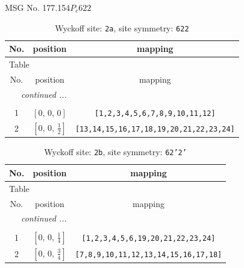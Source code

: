 \documentclass[fleqn,8pt]{jsarticle}
\begin{document}
\setcounter{MaxMatrixCols}{32}

\renewcommand{\tablename}{Table~}
\renewcommand{\figurename}{Figure~}
\begin{center}
\LARGE
MSG No. 177.154\quad$P_{c}622$
\end{center}
\renewcommand{\arraystretch}{1.2}
\begin{longtable}{ccc}
\caption{Wyckoff site: {\tt 2a}, site symmetry: {\tt 622}}
 \\
 \hline \hline
No. & position & mapping \\ \hline \endfirsthead

\multicolumn{2}{l}{\tablename\ \thetable{}} \\
 \hline \hline
No. & position & mapping \\ \hline \endhead

 \hline \hline
\multicolumn{2}{r}{\footnotesize\it continued ...} \\ \endfoot

 \hline \hline
\multicolumn{2}{r}{} \\ \endlastfoot

1 & $\left[ 0,\, 0,\, 0 \right]$ & {\tt [1,2,3,4,5,6,7,8,9,10,11,12]} \\ \hline
2 & $\left[ 0,\, 0,\, \frac{1}{2} \right]$ & {\tt [13,14,15,16,17,18,19,20,21,22,23,24]} \\
\end{longtable}
\renewcommand{\arraystretch}{1.2}
\begin{longtable}{ccc}
\caption{Wyckoff site: {\tt 2b}, site symmetry: {\tt 62'2'}}
 \\
 \hline \hline
No. & position & mapping \\ \hline \endfirsthead

\multicolumn{2}{l}{\tablename\ \thetable{}} \\
 \hline \hline
No. & position & mapping \\ \hline \endhead

 \hline \hline
\multicolumn{2}{r}{\footnotesize\it continued ...} \\ \endfoot

 \hline \hline
\multicolumn{2}{r}{} \\ \endlastfoot

1 & $\left[ 0,\, 0,\, \frac{1}{4} \right]$ & {\tt [1,2,3,4,5,6,19,20,21,22,23,24]} \\ \hline
2 & $\left[ 0,\, 0,\, \frac{3}{4} \right]$ & {\tt [7,8,9,10,11,12,13,14,15,16,17,18]} \\
\end{longtable}
\end{document}
